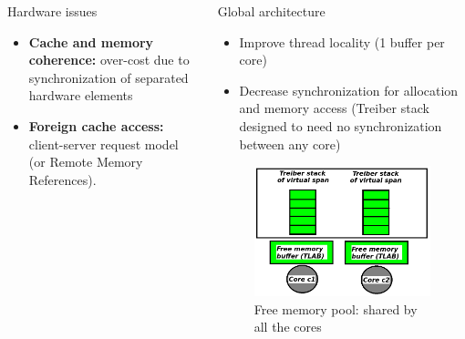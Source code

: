 \documentclass[final]{beamer}
\newlength{\onecolwid}
\newlength{\twocolwid}
\begin{document}
\begin{frame}[t]
\begin{columns}[t]
\begin{column}{\twocolwid}
\begin{columns}[t,totalwidth=\twocolwid]
\begin{column}{\onecolwid}
\begin{block}{Hardware issues}
\begin{itemize}
\item \textbf{Cache and memory coherence:} over-cost due to synchronization of separated hardware elements
\item \textbf{Foreign cache access:} client-server request model (or Remote Memory References).
\end{itemize}


\end{block}


\end{column} %

\begin{column}{\onecolwid}\vspace{-.6in} %


\begin{block}{Global architecture}

\begin{itemize}
	\item Improve thread locality (1 buffer per core)
    \item Decrease synchronization for allocation and memory access (Treiber stack designed to need no synchronization between any core)
\end{itemize}

\begin{figure}
\includegraphics[width=0.8\linewidth]{charts/globalArchitecture.png}
\caption{Free memory pool: shared by all the cores}
\end{figure}


\end{block}
\end{column}
\end{columns}
\end{column}
\end{columns}
\end{frame}
\end{document}
